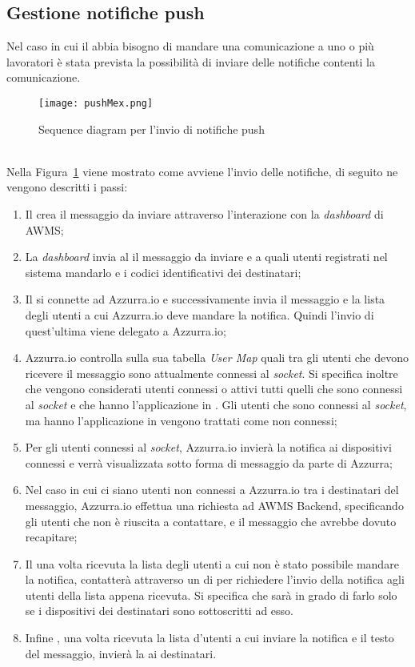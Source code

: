 \subsection{Gestione notifiche push}
Nel caso in cui il  abbia bisogno di mandare una comunicazione a uno o più lavoratori è stata prevista la possibilità di inviare delle notifiche contenti la comunicazione.
\begin{figure}[h]
	\begin{center}
		\texttt{[image: pushMex.png]}
		\caption{Sequence diagram per l'invio di notifiche push}\label{fig:push}
	\end{center}
\end{figure}\\
Nella Figura~\ref{fig:push} viene mostrato come avviene l'invio delle notifiche, di seguito ne vengono descritti i passi:
\begin{enumerate}
	\item Il  crea il messaggio da inviare attraverso l'interazione con la \emph{dashboard} di \gls{AWMS};
	\item La \emph{dashboard} invia al  il messaggio da inviare e a quali utenti registrati nel sistema mandarlo e i codici identificativi dei destinatari;
	\item Il  si connette ad Azzurra.io e successivamente invia il messaggio e la lista degli utenti a cui Azzurra.io deve mandare la notifica. Quindi l'invio di quest'ultima viene delegato a Azzurra.io; 
	\item Azzurra.io controlla sulla sua tabella \emph{User Map} quali tra gli utenti che devono ricevere il messaggio sono attualmente connessi al \emph{socket}. Si specifica inoltre che vengono considerati utenti connessi o attivi tutti quelli che sono connessi al \emph{socket} e che hanno l’applicazione in . Gli utenti che sono connessi al \emph{socket}, ma hanno l’applicazione in  vengono trattati come non connessi;
	\item Per gli utenti connessi al \emph{socket}, Azzurra.io invierà la notifica ai dispositivi connessi e verrà visualizzata sotto forma di messaggio da parte di Azzurra;
	\item Nel caso in cui ci siano utenti non connessi a Azzurra.io tra i destinatari del messaggio, Azzurra.io effettua una richiesta  ad AWMS Backend, specificando gli utenti che non è riuscita a contattare, e il messaggio che avrebbe dovuto recapitare;
	\item Il  una volta ricevuta la lista degli utenti a cui non è stato possibile mandare la notifica, contatterà attraverso un  di  per richiedere l'invio della notifica agli utenti della lista appena ricevuta. Si specifica che  sarà in grado di farlo solo se i dispositivi dei destinatari sono sottoscritti ad esso.
	\item Infine , una volta ricevuta la lista d'utenti a cui inviare la notifica e il testo del messaggio, invierà la  ai destinatari.
\end{enumerate}